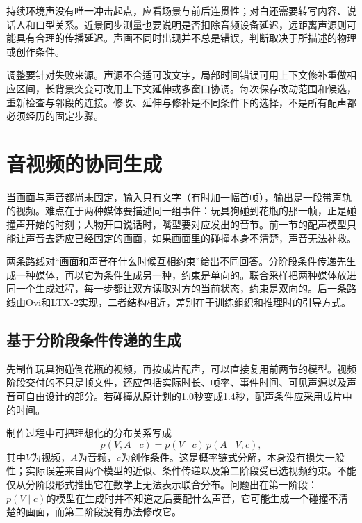 持续环境声没有唯一冲击起点，应看场景与前后连贯性；对白还需要转写内容、说话人和口型关系。近景同步测量也要说明是否扣除音频设备延迟，远距离声源则可能具有合理的传播延迟。声画不同时出现并不总是错误，判断取决于所描述的物理或创作条件。

调整要针对失败来源。声源不合适可改文字，局部时间错误可用上下文修补重做相应区间，长背景突变可改用上下文延伸或多窗口协调。每次保存改动范围和候选，重新检查与邻段的连接。修改、延伸与修补是不同条件下的选择，不是所有配声都必须经历的固定步骤。

\section{音视频的协同生成}
\label{sec:vision-multigen-joint}

当画面与声音都尚未固定，输入只有文字（有时加一幅首帧），输出是一段带声轨的视频。难点在于两种媒体要描述同一组事件：玩具狗碰到花瓶的那一帧，正是碰撞声开始的时刻；人物开口说话时，嘴型要对应发出的音节。前一节的配声模型只能让声音去适应已经固定的画面，如果画面里的碰撞本身不清楚，声音无法补救。

两条路线对“画面和声音在什么时候互相约束”给出不同回答。分阶段条件传递先生成一种媒体，再以它为条件生成另一种，约束是单向的。联合采样把两种媒体放进同一个生成过程，每一步都让双方读取对方的当前状态，约束是双向的。后一条路线由Ovi和LTX-2实现，二者结构相近，差别在于训练组织和推理时的引导方式。

\subsection{基于分阶段条件传递的生成}
\label{sec:vision-multigen-staged}

先制作玩具狗碰倒花瓶的视频，再按成片配声，可以直接复用前两节的模型。视频阶段交付的不只是帧文件，还应包括实际时长、帧率、事件时间、可见声源以及声音可自由设计的部分。若碰撞从原计划的1.0秒变成1.4秒，配声条件应采用成片中的时间。

制作过程中可把理想化的分布关系写成
\begin{equation}
  p(V,A\mid c)=p(V\mid c)\,p(A\mid V,c),
  \label{eq:vision-staged-factorization}
\end{equation}
其中$V$为视频，$A$为音频，$c$为创作条件。这是概率链式分解，本身没有损失一般性；实际误差来自两个模型的近似、条件传递以及第二阶段受已选视频约束。不能仅从分阶段形式推出它在数学上无法表示联合分布。问题出在第一阶段：$p(V\mid c)$的模型在生成时并不知道之后要配什么声音，它可能生成一个碰撞不清楚的画面，而第二阶段没有办法修改它。


